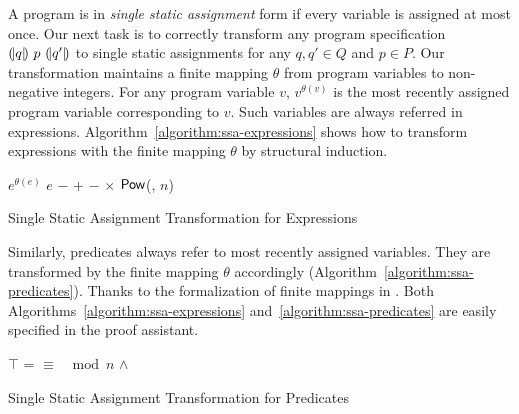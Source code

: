 
A program is in \emph{single static assignment} form if every variable
is assigned at most once.  
Our next task is to correctly transform any
program specification ${(\!|}{q}{|\!)}~{p}~{(\!|}{q'}{|\!)}$ to single static
assignments for any $q, q' \in Q$ and $p \in P$. Our transformation
maintains a finite mapping $\theta$ from program variables to
non-negative integers. For any program variable $v$, $v^{\theta(v)}$ is
the most recently assigned program variable corresponding to $v$. 
Such variables are always referred in
expressions. Algorithm~\ref{algorithm:ssa-expressions} shows how
to transform expressions with the finite mapping $\theta$ by
structural induction.

\begin{algorithm}
  \begin{algorithmic}[1]
       \Return $e^{\theta(e)}$ \EndCase
       \Return $e$ \EndCase
       \Return $-$ \EndCase
        \Return {} $+$ 
      \EndCase
        \Return {} $-$ 
      \EndCase
        \Return {} $\times$ 
      \EndCase
        \Return $\mbox{\textsf{Pow}}$(, $n$)
      \EndCase
    \EndMatch
    \EndFunction
  \end{algorithmic}
  \caption{Single Static Assignment Transformation for Expressions}
  \label{algorithm:ssa-expressions}
\end{algorithm}

Similarly, predicates always refer to most recently assigned
variables. They are transformed by the finite mapping $\theta$
accordingly (Algorithm~\ref{algorithm:ssa-predicates}). Thanks to the
formalization of finite mappings in \coq. Both
Algorithms~\ref{algorithm:ssa-expressions}
and~\ref{algorithm:ssa-predicates} are easily specified in the proof
assistant.

\begin{algorithm}
  \begin{algorithmic}[1]
      \Case{$\top$} \Return $\top$ \EndCase
        \Return {} = 
      \EndCase
        \Return {} $\equiv$ 
                 $\mod n$
      \EndCase
        \Return {} $\wedge$
      \EndCase
    \EndMatch
    \EndFunction
  \end{algorithmic}
  \caption{Single Static Assignment Transformation for Predicates}
  \label{algorithm:ssa-predicates}
\end{algorithm}

